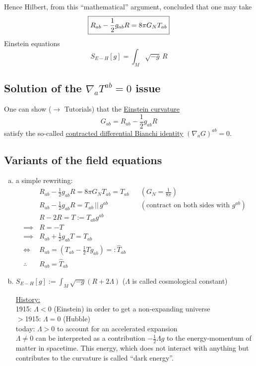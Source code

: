 Hence Hilbert, from this ``mathematical'' argument, concluded that one may take
\[
\boxed{ R_{ab} - \frac{1}{2} g_{ab} R = 8 \pi G_N T_{ab} }  \\
\]
Einstein equations
\[
S_{E-H}[g] = \int_M \sqrt{-g} \, R
\]

\subsection{Solution of the $\nabla_a T^{ab} =0$ issue}
One can show ($\to$ Tutorials) that the \underline{Einstein curvature}
\[
G_{ab} = R_{ab} - \frac{1}{2} g_{ab}R
\]
satisfy the so-called \underline{contracted differential Bianchi identity} $(\nabla_a G)^{ab} = 0$.

\subsection{Variants of the field equations}
\begin{enumerate}[(a)]
\item a simple rewriting:
\begin{align*}
& R_{ab} - \frac{1}{2} g_{ab} R = 8 \pi G_N T_{ab} = T_{ab} && (G_N = \frac{1}{8\pi}) \\
& R_{ab} - \frac{1}{2} g_{ab} R = T_{ab} \, || \, g^{ab} && (\text{contract on both sides with } g^{ab}) \\
& R - 2R = T := T_{ab}g^{ab} \\
\implies & R = -T \\
\implies & R_{ab} + \frac{1}{2} g_{ab} T = T_{ab} \\
\Longleftrightarrow & R_{ab} = (T_{ab} - \frac{1}{2} Tg_{ab}) =: \widehat{T}_{ab} \\
\therefore \quad & \boxed{ R_{ab} = \widehat{T}_{ab}}
\end{align*}

\item $S_{E-H}[g] := \int_M \sqrt{-g} (R+ 2\Lambda)$ \quad \quad ($\Lambda$ is called cosmological constant)

\underline{History:} \\
1915: $\Lambda < 0$ (Einstein) in order to get a non-expanding universe \\
$>$1915: $\Lambda = 0$ (Hubble) \\
today: $\Lambda > 0$ to account for an accelerated expansion \\
$\Lambda \neq 0$ can be interpreted as a contribution $-\frac{1}{2} \Lambda g$ to the energy-momentum of matter in spacetime. This energy, which does not interact with anything but contributes to the curvature is called ``dark energy''.
\end{enumerate}

